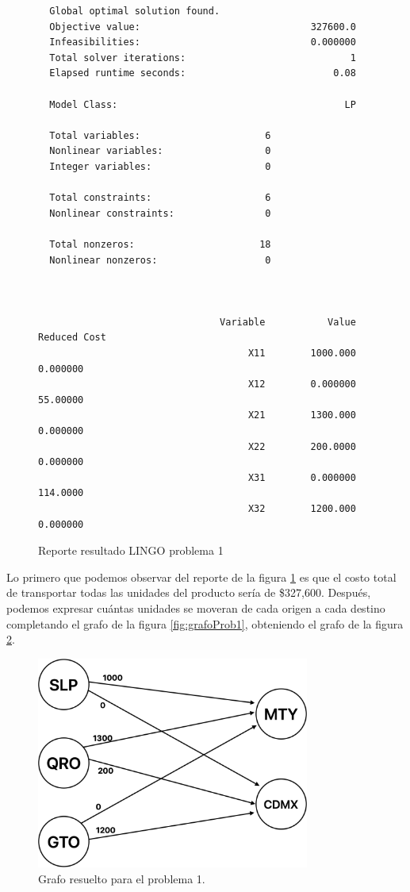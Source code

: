 \documentclass[12pt]{article}  %
\begin{document}
\begin{figure}[H]
	\centering
	\caption{Reporte resultado LINGO problema 1}
	\label{fig:reporteProb1}
	\begin{verbatim}
  Global optimal solution found.
  Objective value:                              327600.0
  Infeasibilities:                              0.000000
  Total solver iterations:                             1
  Elapsed runtime seconds:                          0.08

  Model Class:                                        LP

  Total variables:                      6
  Nonlinear variables:                  0
  Integer variables:                    0

  Total constraints:                    6
  Nonlinear constraints:                0

  Total nonzeros:                      18
  Nonlinear nonzeros:                   0



                                Variable           Value        Reduced Cost
                                     X11        1000.000            0.000000
                                     X12        0.000000            55.00000
                                     X21        1300.000            0.000000
                                     X22        200.0000            0.000000
                                     X31        0.000000            114.0000
                                     X32        1200.000            0.000000

	\end{verbatim}
\end{figure}

Lo primero que podemos observar del reporte de la figura \ref{fig:reporteProb1} es que el costo total de transportar todas las unidades del producto sería de \$327,600. Después, podemos expresar cuántas unidades se moveran de cada origen a cada destino completando el grafo de la figura \ref{fig:grafoProb1}, obteniendo el grafo de la figura \ref{fig:grafoResProb1}.

\begin{figure}[H]
\centering
\caption{Grafo resuelto para el problema 1.}
\label{fig:grafoResProb1}
\includegraphics[width=0.8\textwidth]{assets/grafoProb1Res.png}
\end{figure}
\end{document}
